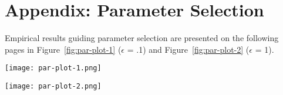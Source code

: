 \section{Appendix: Parameter Selection}
\label{Sec:AppOptPars}

Empirical results guiding parameter selection are presented on the following
pages in Figure~\ref{fig:par-plot-1} ($\epsilon$ = .1) and Figure~\ref{fig:par-plot-2} 
($\epsilon$ = 1). 

\begin{figure*}[h]
\centering
\texttt{[image: par-plot-1.png]}
\caption{Power comparison in settings where $\epsilon = .1$. Within each subplot,
each color curve corresponds to a different value of $q$ (blue: 0.75, gold: 1,
green: 1.5, red: 2). The two main columns
of plots correspond to different values of $k$ and the three main rows correspond
to difference values of $\rho$. Note that the scale on the x-axis differs with $k$
($k = 7$ requires more data).}\label{fig:par-plot-1}
\end{figure*}

\begin{figure*}[h]
\centering
\texttt{[image: par-plot-2.png]}
\caption{Power comparison in settings where $\epsilon = 1$. Within each subplot,
each color curve corresponds to a different value of $q$ (blue: 0.75, gold: 1,
green: 1.5, red: 2). The two main columns
of plots correspond to different values of $k$ and the three main rows correspond
to difference values of $\rho$. Note that the scale on the x-axis differs with $k$
($k = 7$ requires more data).}\label{fig:par-plot-2}
\end{figure*}
